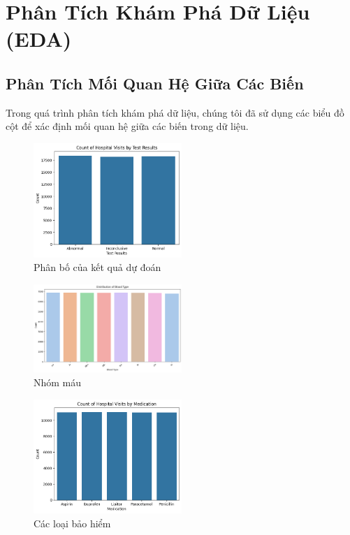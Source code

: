 \documentclass[a4paper,12pt]{report}
\begin{document}
\section{Phân Tích Khám Phá Dữ Liệu (EDA)}

\subsection{Phân Tích Mối Quan Hệ Giữa Các Biến}
Trong quá trình phân tích khám phá dữ liệu, chúng tôi đã sử dụng các biểu đồ cột để xác định mối quan hệ giữa các biến trong dữ liệu.

\begin{figure}[h]
    \centering
    \includegraphics[width=0.5\textwidth]{image/test_results.png}
    \caption{Phân bố của kết quả dự đoán}
    \label{fig:test_result}
\end{figure}

\begin{figure}[h]
    \centering
    \includegraphics[width=0.5\textwidth]{image/blood.png}
    \caption{Nhóm máu}
    \label{fig:blood}
\end{figure}

\begin{figure}[h]
    \centering
    \includegraphics[width=0.5\textwidth]{image/medication.png}
    \caption{Các loại bảo hiểm}
    \label{fig:medication}
\end{figure}
\end{document}
